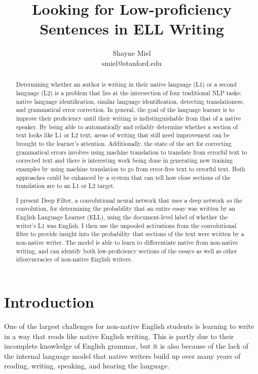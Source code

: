 \documentclass{article} %
\title{Looking for Low-proficiency Sentences in ELL Writing}
\author{
Shayne Miel \\
{\fontsize{.28cm}{.1cm}\selectfont \frenchspacing smiel@stanford.edu} \\
}
\begin{document}
\maketitle

\begin{abstract}
Determining whether an author is writing in their native language (L1) or a
second language (L2) is a problem that lies at the intersection of four
traditional NLP tasks: native language identification, similar language
identification, detecting translationese, and grammatical error correction.
In general, the goal of the language
learner is to improve their proficiency until their writing is indistinguishable
from that of a native speaker. By being able to automatically and reliably
determine whether a section of text looks like L1 or L2 text, areas of writing
that still need improvement can be brought to the learner's attention.
Additionally, the state of the art for correcting grammatical errors involves
using machine translation to translate from errorful text to corrected text\cite{chollampatt}
and there is interesting work being done in generating new training examples
by using machine translation to go
from error-free text to errorful text.\cite{liu} Both approaches could be enhanced by a
system that can tell how close sections of the translation are to an L1 or L2
target.

I present Deep Filter, a convolutional neural network that uses a deep network \textit{as}
the convolution, for determining the probability
that an entire essay was written by an English Language Learner (ELL), using the
document-level label of whether the writer's L1 was English. I then use
the unpooled activations from the convolutional filter to provide insight
into the probability that sections of the text were written by a non-native
writer. The model is able to learn to differentiate native from non-native writing,
and can identify both low-proficiency sections of the essays as well as other
idiosyncracies of non-native English writers.
\end{abstract}

\section{Introduction}

One of the largest challenges for non-native English students is learning to
write in a way that reads like native English writing. This is partly due to their
incomplete knowledge of English grammar, but it is also because of the lack of the
internal language model that native writers build up over many years of reading,
writing, speaking, and hearing the language.
\end{document}
